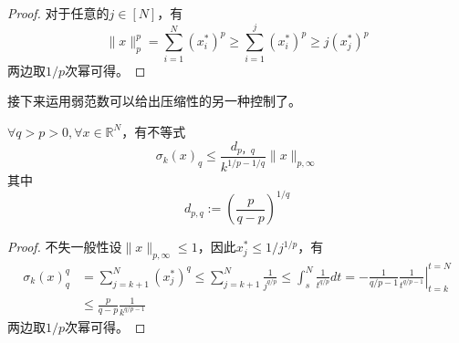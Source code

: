 \begin{proof}
    对于任意的$j \in [N]$，有
    \begin{equation}
        \|x\|_p^p=\sum_{i=1}^N\left(x_i^*\right)^p \geq \sum_{i=1}^j\left(x_i^*\right)^p \geq j\left(x_j^*\right)^p
    \end{equation}
    两边取$1/p$次幂可得。
\end{proof}
接下来运用弱范数可以给出压缩性的另一种控制了。
\begin{theorem}
    $\forall q>p>0,\forall x\in \mathbb{R}^N$，有不等式
    \begin{equation}
        \sigma_k(x)_q \leq \frac{d_{p，q}}{k^{1 / p-1 / q}}\|x\|_{p,\infty}
    \end{equation}
    其中
    \begin{equation}
        d_{p,q}:=\left(\frac{p}{q-p}\right)^{1 / q}
    \end{equation}
\end{theorem}
\begin{proof}
    不失一般性设$\|x\|_{p,\infty}\le 1$，因此$x^*_j\le 1/j^{1/p}$，有
    \begin{equation}
        \begin{aligned}
        \sigma_k(x)_q^q & =\sum_{j=k+1}^N\left(x_j^*\right)^q \leq \sum_{j=k+1}^N \frac{1}{j^{q / p}} \leq \int_s^N \frac{1}{t^{q / p}} d t=-\left.\frac{1}{q / p-1} \frac{1}{t^{q / p-1}}\right|_{t=k} ^{t=N} \\
        & \leq \frac{p}{q-p} \frac{1}{k^{q / p-1}} 
        \end{aligned}
        \end{equation}
        两边取$1/p$次幂可得。
\end{proof}

